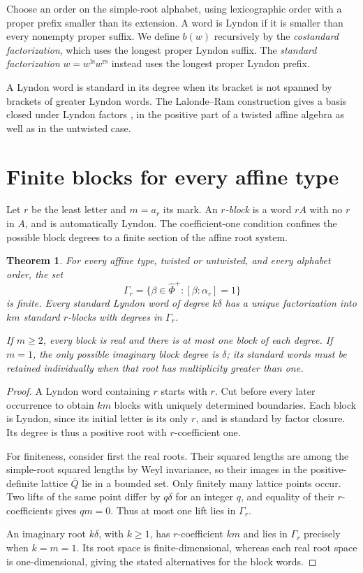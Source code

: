 \documentclass[11pt]{amsart}
\numberwithin{equation}{section}
\newtheorem{theorem}{Theorem}[section]
\theoremstyle{definition}
\newcommand{\br}[1]{b(#1)}
\newcommand{\ls}{\mathrm{ls}}
\begin{document}
Choose an order on the simple-root alphabet, using lexicographic order with a proper prefix smaller than its extension. A word is Lyndon if it is smaller than every nonempty proper suffix. We define $\br{w}$ recursively by the \emph{costandard factorization}, which uses the longest proper Lyndon suffix. The \emph{standard factorization} $w=w^{\ls}w^{\mathrm{rs}}$ instead uses the longest proper Lyndon prefix.

A Lyndon word is standard in its degree when its bracket is not spanned by brackets of greater Lyndon words. The Lalonde--Ram construction gives a basis closed under Lyndon factors \cite{LR}, in the positive part of a twisted affine algebra as well as in the untwisted case.

\section{Finite blocks for every affine type}\label{sec:finite}

Let $r$ be the least letter and $m=a_r$ its mark. An \emph{$r$-block} is a word $rA$ with no $r$ in $A$, and is automatically Lyndon. The coefficient-one condition confines the possible block degrees to a finite section of the affine root system.

\begin{theorem}\label{thm:all-blocks}
For every affine type, twisted or untwisted, and every alphabet order, the set
\[
 \Gamma_r=\{\beta\in\widehat\Phi^+:[\beta:\alpha_r]=1\}
\]
is finite. Every standard Lyndon word of degree $k\delta$ has a unique factorization into $km$ standard $r$-blocks with degrees in $\Gamma_r$.

If $m\geq2$, every block is real and there is at most one block of each degree. If $m=1$, the only possible imaginary block degree is $\delta$; its standard words must be retained individually when that root has multiplicity greater than one.
\end{theorem}
\begin{proof}
A Lyndon word containing $r$ starts with $r$. Cut before every later occurrence to obtain $km$ blocks with uniquely determined boundaries. Each block is Lyndon, since its initial letter is its only $r$, and is standard by factor closure. Its degree is thus a positive root with $r$-coefficient one.

For finiteness, consider first the real roots. Their squared lengths are among the simple-root squared lengths by Weyl invariance, so their images in the positive-definite lattice $\overline Q$ lie in a bounded set. Only finitely many lattice points occur. Two lifts of the same point differ by $q\delta$ for an integer $q$, and equality of their $r$-coefficients gives $qm=0$. Thus at most one lift lies in $\Gamma_r$.

An imaginary root $k\delta$, with $k\geq1$, has $r$-coefficient $km$ and lies in $\Gamma_r$ precisely when $k=m=1$. Its root space is finite-dimensional, whereas each real root space is one-dimensional, giving the stated alternatives for the block words.
\end{proof}
\end{document}

